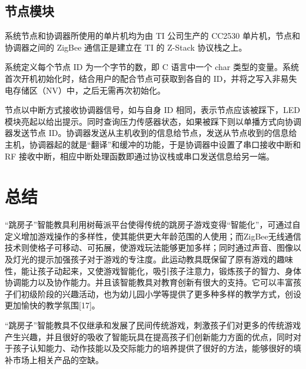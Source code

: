 \begin{spacing}{1.2}
 \subsection{节点模块}
    系统节点和协调器所使用的单片机均为由 TI 公司生产的 CC2530 单片机，节点和协调器之间的 ZigBee 通信正是建立在 TI 的 Z-Stack 协议栈之上。

    系统定义每个节点 ID 为一个字节的数，即 C 语言中一个 char 类型的变量。系统首次开机初始化时，结合用户的配合节点可获取到各自的 ID，并将之写入非易失电存储区（NV）中，之后无需再次初始化。

    节点以中断方式接收协调器信号，如与自身 ID 相同，表示节点应该被踩下，LED 模块亮起以给出提示。同时查询压力传感器状态，如果被踩下则以单播方式向协调器发送节点 ID。协调器发送从主机收到的信息给节点，发送从节点收到的信息给主机，协调器起的就是“翻译”和缓冲的功能，于是协调器中设置了串口接收中断和 RF 接收中断，相应中断处理函数即通过协议栈或串口发送信息给另一端。

\section{总结}
    “跳房子”智能教具利用树莓派平台使得传统的跳房子游戏变得“智能化”，可通过自定义增加游戏操作的多样性，使其能供更大年龄范围的人使用；而ZigBee无线通信技术则使格子可移动、可拓展，使游戏玩法能够更加多样；同时通过声音、图像以及灯光的提示加强孩子对于游戏的专注度。此运动教具既保留了原有游戏的趣味性，能让孩子动起来，又使游戏智能化，吸引孩子注意力，锻炼孩子的智力、身体协调能力以及协作能力。并且该智能教具对教育创新有很大的支持。它可以丰富孩子们初级阶段的兴趣活动，也为幼儿园小学等提供了更多种多样的教学方式，创设更加愉快的教学氛围[17]。

    “跳房子”智能教具不仅继承和发展了民间传统游戏，刺激孩子们对更多的传统游戏产生兴趣，并且很好的吸收了智能玩具在提高孩子们创新能力方面的优点，同时对于孩子认知能力、动作技能以及交际能力的培养提供了很好的方法，能够很好的填补市场上相关产品的空缺。

\end{spacing}

